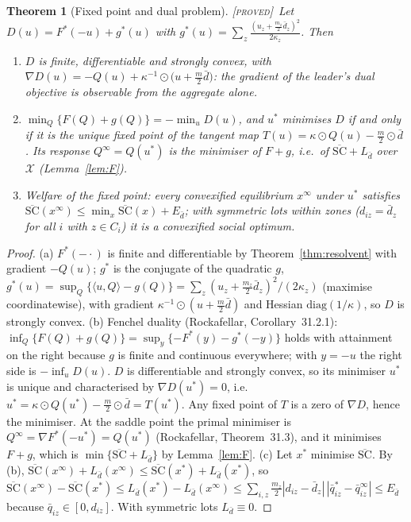 \documentclass[11pt]{article}
\newtheorem{theorem}{Theorem}
\theoremstyle{definition}
\theoremstyle{remark}
\newcommand{\cX}{\mathcal{X}}
\newcommand{\ip}[2]{\langle #1,#2\rangle}
\newcommand{\qbar}{\bar q}
\newcommand{\dbar}{\bar d}
\newcommand{\SCbar}{\overline{\mathrm{SC}}}
\newcommand{\PROVED}{{\normalfont\textsc{[proved]}}}
\begin{document}
\begin{theorem}[Fixed point and dual problem]\label{thm:fixed}\PROVED\
Let $D(u)=F^*(-u)+g^*(u)$ with $g^*(u)=\sum_z\frac{(u_z+\frac{m_z}{2}\dbar_z)^2}{2\kappa_z}$. Then
\begin{enumerate}[label=(\alph*)]
\item $D$ is finite, differentiable and strongly convex, with $\nabla D(u)=-Q(u)+\kappa^{-1}\odot\big(u+\tfrac m2\dbar\big)$: the gradient of the leader's dual objective is observable from the aggregate alone.
\item $\min_Q\{F(Q)+g(Q)\}=-\min_uD(u)$, and $u^*$ minimises $D$ if and only if it is the unique fixed point of the tangent map $T(u)=\kappa\odot Q(u)-\tfrac m2\odot\dbar$. Its response $Q^\infty=Q(u^*)$ is the minimiser of $F+g$, i.e.\ of $\SCbar+L_{\dbar}$ over $\cX$ (Lemma~\ref{lem:F}).
\item Welfare of the fixed point: every convexified equilibrium $x^\infty$ under $u^*$ satisfies $\SCbar(x^\infty)\le\min_x\SCbar(x)+E_{\dbar}$; with symmetric lots within zones ($d_{iz}=\dbar_z$ for all $i$ with $z\in C_i$) it is a convexified social optimum.
\end{enumerate}
\end{theorem}
\begin{proof}
(a) $F^*(-\cdot)$ is finite and differentiable by Theorem~\ref{thm:resolvent} with gradient $-Q(u)$; $g^*$ is the conjugate of the quadratic $g$, $g^*(u)=\sup_Q\{\ip uQ-g(Q)\}=\sum_z(u_z+\tfrac{m_z}{2}\dbar_z)^2/(2\kappa_z)$ (maximise coordinatewise), with gradient $\kappa^{-1}\odot(u+\tfrac m2\dbar)$ and Hessian $\mathrm{diag}(1/\kappa)$, so $D$ is strongly convex.
(b) Fenchel duality (Rockafellar, Corollary~31.2.1): $\inf_Q\{F(Q)+g(Q)\}=\sup_y\{-F^*(y)-g^*(-y)\}$ holds with attainment on the right because $g$ is finite and continuous everywhere; with $y=-u$ the right side is $-\inf_uD(u)$. $D$ is differentiable and strongly convex, so its minimiser $u^*$ is unique and characterised by $\nabla D(u^*)=0$, i.e.\ $u^*=\kappa\odot Q(u^*)-\tfrac m2\odot\dbar=T(u^*)$. Any fixed point of $T$ is a zero of $\nabla D$, hence the minimiser. At the saddle point the primal minimiser is $Q^\infty=\nabla F^*(-u^*)=Q(u^*)$ (Rockafellar, Theorem~31.3), and it minimises $F+g$, which is $\min\{\SCbar+L_{\dbar}\}$ by Lemma~\ref{lem:F}.
(c) Let $x^*$ minimise $\SCbar$. By (b), $\SCbar(x^\infty)+L_{\dbar}(x^\infty)\le\SCbar(x^*)+L_{\dbar}(x^*)$, so $\SCbar(x^\infty)-\SCbar(x^*)\le L_{\dbar}(x^*)-L_{\dbar}(x^\infty)\le\sum_{i,z}\tfrac{m_z}{2}|d_{iz}-\dbar_z|\,|\qbar^*_{iz}-\qbar^\infty_{iz}|\le E_{\dbar}$ because $\qbar_{iz}\in[0,d_{iz}]$. With symmetric lots $L_{\dbar}\equiv0$.
\end{proof}
\end{document}
